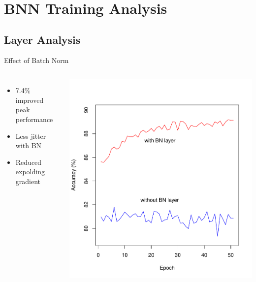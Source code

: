 \documentclass[aspectratio=1610, 12pt]{beamer}
\begin{document}
\section{BNN Training Analysis}
\begin{frame}
\tableofcontents[currentsection]
\end{frame}
\subsection{Layer Analysis}
\begin{frame}{Effect of Batch Norm}
 	\begin{columns}
 		\begin{itemize}
 			\item 7.4\% improved peak performance
 			\item Less jitter with BN
 			\item Reduced expolding gradient
 		\end{itemize}
 		
 		\centering
 		\includegraphics[scale=0.45]{images/batchnorm_measurement.pdf}
 	\end{columns}
\end{frame}
\end{document}
